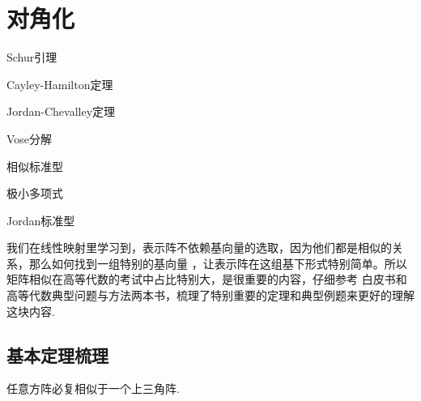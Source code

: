 \chapter{对角化}\label{section3}

\begin{introduction}
	\item Schur引理
	\item Cayley-Hamilton定理
	\item Jordan-Chevalley定理
	\item Vose分解
	\item 相似标准型
	\item 极小多项式
	\item Jordan标准型
\end{introduction}

我们在线性映射里学习到，表示阵不依赖基向量的选取，因为他们都是相似的关系，那么如何找到一组特别的基向量
，让表示阵在这组基下形式特别简单。所以矩阵相似在高等代数的考试中占比特别大，是很重要的内容，仔细参考
白皮书和高等代数典型问题与方法两本书，梳理了特别重要的定理和典型例题来更好的理解这块内容.

\section{基本定理梳理}

\begin{theorem}[Schur引理]
	任意方阵必复相似于一个上三角阵.
\end{theorem}

